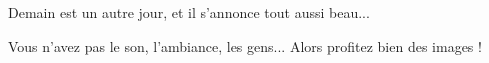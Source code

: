 \begin{multicols}{2}
Demain est un autre jour, et il s'annonce tout aussi beau...

Vous n'avez pas le son, l'ambiance, les gens... Alors profitez bien des images !


\end{multicols}


